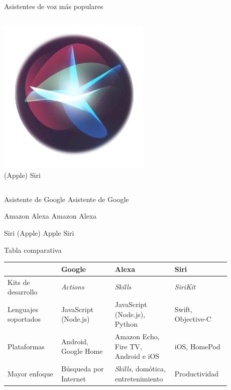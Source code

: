 \documentclass{beamer}
\begin{document}
\begin{frame}[c]{Asistentes de voz más populares}
    \vspace{2em}

    \begin{columns}
      \begin{column}{\textwidth}
        \centering
        \includegraphics[scale=.4]{apple-siri-logo.png}\\
        (Apple) Siri
      \end{column}
    \end{columns}
  \end{frame}

  \begin{frame}{ Asistente de Google}
    Asistente de Google
  \end{frame}

  \begin{frame}{ Amazon Alexa}
    Amazon Alexa
  \end{frame}

  \begin{frame}{ Siri (Apple)}
    Apple Siri
  \end{frame}

  \begin{frame}[c]{Tabla comparativa}
    \begin{tabular}{@{}|>{\raggedright\small}p{0.22\linewidth}|>{\raggedright\small}p{0.22\linewidth}|>{\raggedright\small}p{0.22\linewidth}|>{\raggedright\arraybackslash\small}p{0.22\linewidth}| @{}}
      \hline
      & \normalsize Google & \normalsize \textbf{Alexa} & \normalsize Siri \\
      \hline
      Kits de desarrollo & \emph{Actions} & \emph{Skills} & \emph{SiriKit} \\
      \hline
      Lenguajes soportados & JavaScript (Node.js) & JavaScript (Node.js), Python & Swift, Objective-C \\
      \hline
      Plataformas & Android, Google Home & Amazon Echo, Fire TV, Android e iOS & iOS, HomePod \\
      \hline
      Mayor enfoque & Búsqueda por Internet & \emph{Skills}, domótica, entretenimiento & Productividad \\
      \hline 
    \end{tabular}
  \end{frame}
\end{document}
